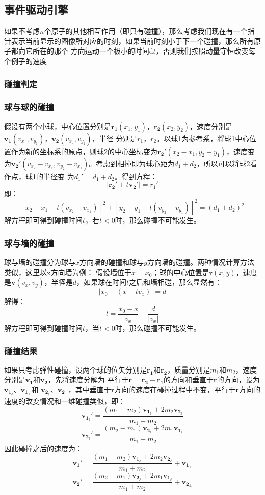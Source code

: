 ﻿\documentclass{article}
\begin{document}
	\subsection{事件驱动引擎}
	如果不考虑$n$个原子的其他相互作用（即只有碰撞），那么考虑我们现在有一个指针表示当前显示的图像所对应的时刻，如果当前时刻小于下一个碰撞，那么所有原子都向它所在的那个
	方向运动一个极小的时间$\mathrm{d}t$，否则我们按照动量守恒改变每个例子的速度
	\subsubsection{碰撞判定}
	\subsubsection*{球与球的碰撞}
	假设有两个小球，中心位置分别是$\mathbf{r_1}(x_1,y_1)$，$\mathbf{r_2}(x_2,y_2)$，速度分别是$\mathbf{v_1}(v_{x_1},v_{y_1})$，$\mathbf{v_2}(v_{x_2},v_{y_2})$，半径
	分别是$r_1$，$r_2$。以球1为参考系，将球1中心位置作为新的坐标系的原点，则球2的中心坐标变为$\mathbf{r_2'}(x_2-x_1,y_2-y_1)$，速度变
	为$\mathbf{v_2'}(v_{x_2}-v_{x_1},v_{y_2}-v_{x_1})$。考虑到相撞即为球心距为$d_1+d_2$，所以可以将球2看作点，球1的半径变
	为$d_1'=d_1+d_2$。得到方程：
	\[|\mathbf{r_2'}+t\mathbf{v_2'}|=r_1'\]
	即：
	\[[x_2-x_1+t(v_{x_2}-v_{x_1})]^2+[y_2-y_1+t(v_{y_2}-v_{y_1})]^2=(d_1+d_2)^2\]
	解方程即可得到碰撞时间$t$，若$t<0$时，那么碰撞不可能发生。
	\subsubsection*{球与墙的碰撞}
	球与墙的碰撞分为球与$x$方向墙的碰撞和球与$y$方向墙的碰撞。两种情况计算方法类似，这里以x方向墙为例：
	假设墙位于$x=x_0$；球的中心位置是$\mathbf{r}(x,y)$，速度是$\mathbf{v}(v_x,v_y)$，半径是$d$，如果球在时间$t$之后和墙相碰，那么显然有：
	\[|x_0-(x+tv_x)|=d\]
	解得：
	\[t=\frac{x_0-x}{v_x}-\frac{d}{|v_x|}\]
	解方程即可得到碰撞时间$t$，当$t<0$时，那么碰撞不可能发生。
	\subsubsection{碰撞结果}
	如果只考虑弹性碰撞\cite{ref3}，设两个球的位矢分别是$\mathbf{r_1}$和$\mathbf{r_2}$，质量分别是$m_1$和$m_2$，速度分别是$\mathbf{v_1}$和$\mathbf{v_2}$，先将速度分解为
	平行于$\mathbf{r} = \mathbf{r_2} - \mathbf{r_1}$的方向和垂直于$\mathbf{r}$的方向，设为$\mathbf{v_{1_\sslash}}$、$\mathbf{v_{1_\perp}}$和
	$\mathbf{v_{2_\sslash}}$、$\mathbf{v_{2_\perp}}$，其中垂直于$\mathbf{r}$方向的速度在碰撞过程中不变，平行于$\mathbf{r}$方向的速度的改变情况和一维碰撞类似，即：
	\[\mathbf{v_{1_\sslash}'} = \frac{(m_1 - m_2)\mathbf{v_{1_\sslash}}+2m_2\mathbf{v_{2_\sslash}}}{m_1 + m_2}\]
	\[\mathbf{v_{2_\sslash}'} = \frac{(m_2 - m_1)\mathbf{v_{2_\sslash}}+2m_1\mathbf{v_{1_\sslash}}}{m_1 + m_2}\]
	因此碰撞之后的速度为：
	\[\mathbf{v_1'} = \frac{(m_1 - m_2)\mathbf{v_{1_\sslash}}+2m_2\mathbf{v_{2_\sslash}}}{m_1 + m_2} + \mathbf{v_{1_\perp}}\]
	\[\mathbf{v_2'} = \frac{(m_2 - m_1)\mathbf{v_{2_\sslash}}+2m_1\mathbf{v_{1_\sslash}}}{m_1 + m_2} + \mathbf{v_{2_\perp}}\]
\end{document}
